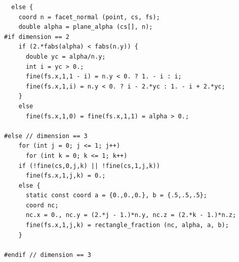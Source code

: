 \documentclass[a4paper]{article}
\newcommand{\para}[1]{\textbf{\emph{\textcolor{para}{#1}}}}
\begin{document}
\begin{multicols}{2}
 \columnbreak
 \begin{verbatim}
  else {
    coord n = facet_normal (point, cs, fs);
    double alpha = plane_alpha (cs[], n);
#if dimension == 2
    if (2.*fabs(alpha) < fabs(n.y)) {
      double yc = alpha/n.y;
      int i = yc > 0.;
      fine(fs.x,1,1 - i) = n.y < 0. ? 1. - i : i;
      fine(fs.x,1,i) = n.y < 0. ? i - 2.*yc : 1. - i + 2.*yc;
    }
    else
      fine(fs.x,1,0) = fine(fs.x,1,1) = alpha > 0.;

#else // dimension == 3
    for (int j = 0; j <= 1; j++)
      for (int k = 0; k <= 1; k++)
	if (!fine(cs,0,j,k) || !fine(cs,1,j,k))
	  fine(fs.x,1,j,k) = 0.;
	else {
	  static const coord a = {0.,0.,0.}, b = {.5,.5,.5};
	  coord nc;
	  nc.x = 0., nc.y = (2.*j - 1.)*n.y, nc.z = (2.*k - 1.)*n.z;
	  fine(fs.x,1,j,k) = rectangle_fraction (nc, alpha, a, b);
	}

#endif // dimension == 3
 \end{verbatim}
\end{multicols}

\begin{center}
\end{center}
\newpage
\end{document}
